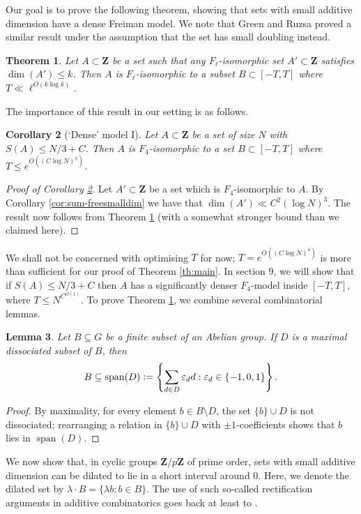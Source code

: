\documentclass[11pt, reqno]{amsart}
\newtheorem{theorem}{Theorem}[section]
\newtheorem{lemma}[theorem]{Lemma}
\newtheorem{cor}[theorem]{Corollary}
\DeclareMathOperator{\Span}{span}
\begin{document}
Our goal is to prove the following theorem, showing that sets with small additive dimension have a dense Freiman model. We note that Green and Ruzsa \cite{greenruzsa} proved a similar result under the assumption that the set has small doubling instead.
\begin{theorem}\label{th:densemodel}
    Let $A\subset \mathbf{Z}$ be a set such that any $F_\ell$-isomorphic set $A'\subset \mathbf{Z}$ satisfies $\dim(A')\leqslant k$.
    Then $A$ is $F_\ell$-isomorphic to a subset $B\subset [-T,T]$ where $T\ll \ell^{O(k\log k)}$.
 
\end{theorem}
The importance of this result in our setting is as follows. 
\begin{cor}[`Dense' model I]\label{cor:densemodel}
    Let $A\subset \mathbf{Z}$ be a set of size $N$ with $S(A)\leqslant N/3+C$. Then $A$ is $F_4$-isomorphic to a set $B\subset [-T,T]$ where $T\leqslant e^{O((C\log N)^4)}$.
\end{cor}
\begin{proof}[Proof of Corollary \ref{cor:densemodel}]
Let $A'\subset \mathbf{Z}$ be a set which is $F_4$-isomorphic to $A$. By Corollary \ref{cor:sum-freesmalldim} we have that $\dim(A')\ll C^2(\log N)^3$. The result now follows from Theorem \ref{th:densemodel} (with a somewhat stronger bound than we claimed here).
\end{proof}
We shall not be concerned with optimising $T$ for now; $T=e^{O((C\log N)^4)}$ is more than sufficient for our proof of Theorem \ref{th:main}. In section 9, we will show that if $S(A)\leqslant N/3+C$ then $A$ has a significantly denser $F_4$-model inside $[-T,T]$, where $T\leqslant N^{C^{O(1)}}$.
To prove Theorem \ref{th:densemodel}, we combine several combinatorial lemmas.
\begin{lemma}\label{lem:dissociated-set-generator}
Let $B \subseteq G$ be a finite subset of an Abelian group.  If $D$ is a maximal dissociated subset of $B$, then
$$B \subseteq \Span(D) \vcentcolon= \left\{\sum_{d\in D}\varepsilon_d d: \varepsilon_d\in\{-1,0,1\}\right\}.$$
\end{lemma}

\begin{proof}
By maximality, for every element $b\in B\setminus D$, the set $\{b\}\cup D$ is not dissociated; rearranging a relation in $\{b\}\cup D$ with $\pm 1$-coefficients shows that $b$ lies in $\Span(D)$.
\end{proof}

We now show that, in cyclic groups $\mathbf{Z}/p\mathbf{Z}$ of prime order, sets with small additive dimension can be dilated to lie in a short interval around $0$. Here, we denote the dilated set by $\lambda\cdot B=\{\lambda b:b\in B\}$. The use of such so-called rectification arguments in additive combinatorics goes back at least to \cite{bilulevruzsa}.
\end{document}
